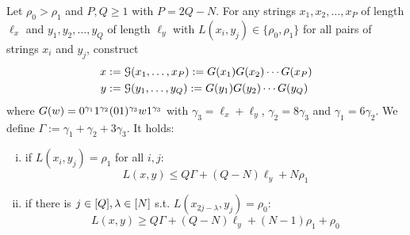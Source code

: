 \begin{lemma}
\label{lem:1-2vs1gadget}
Let $\rho_0 > \rho_1$ and $P, Q \geq 1$ with $P = 2Q - N$.
For any strings $x_1, x_2, \ldots, x_P$ of length $\ell_x$ and $y_1, y_2, \ldots, y_Q$ of length $\ell_y$ with $L(x_i, y_j) \in \{\rho_0, \rho_1\}$ for all pairs of strings $x_i$ and $y_j$, construct
\begin{align*}
	x &:= \mathcal{G}(x_1, \ldots, x_P) := G(x_1)G(x_2) \cdots G(x_P)\\
	y &:= \mathcal{G}(y_1, \ldots, y_Q) := G(y_1)G(y_2) \cdots G(y_Q)
\end{align*}
where $G(w) = 0^{\gamma_1}1^{\gamma_2}(01)^{\gamma_3}w1^{\gamma_3}$ with $\gamma_3 = \ell_x + \ell_y$, $\gamma_2 = 8\gamma_3$ and $\gamma_1 = 6\gamma_2$.
We define $\Gamma := \gamma_1 + \gamma_2 + 3\gamma_3$.
It holds:
%
\begin{enumerate}[(i)]
\item\label{lem:1-2vs1gadget:not-ortho} if $L(x_i, y_j) = \rho_1$ for all $i,j$: 
\[ 
L(x,y) \leq Q\Gamma + (Q-N)\ell_y + N\rho_1
\]
\item\label{lem:1-2vs1gadget:ortho} if there is $j \in [Q], \lambda \in [N]$ s.t. $L(x_{2j-\lambda}, y_j) = \rho_0$: 
\[
L(x,y) \geq Q\Gamma + (Q-N)\ell_y + (N-1)\rho_1 + \rho_0
\]


\end{enumerate}
%

\end{lemma}

